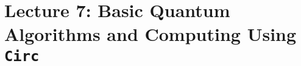 \section{Lecture 7: Basic Quantum Algorithms and Computing Using \texttt{Circ} }\label{sec:Lecture 7} %

